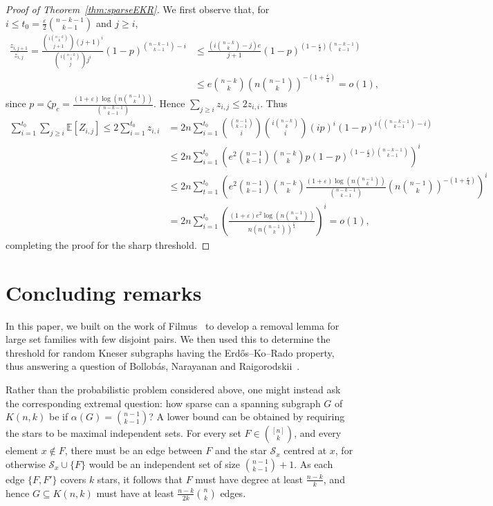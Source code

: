\documentclass[11pt]{article}
\theoremstyle{definition}
\newcommand{\eps}{\varepsilon}
\newcommand{\cS}{\mathcal{S}}
\newcommand{\3}{\bf{3}}
\newcommand{\Exp}{\mathbb{E}}
\begin{document}
\begin{proof}[Proof of Theorem~\ref{thm:sparseEKR}]
We first observe that, for $i \le t_0 = \frac{\eps}{2} \binom{n-k-1}{k-1}$ and $j \ge i$,
\begin{align*}
\frac{z_{i,j+1}}{z_{i,j}} = \frac{\binom{i \binom{n-k}{k}}{j+1} (j+1)^i}{\binom{i \binom{n-k}{k}}{j} j^i } \left( 1- p \right)^{\binom{n-k-1}{k-1} - i} &\le \frac{\left( i \binom{n-k}{k} - j \right) e}{j+1}\left( 1- p \right)^{\left(1 - \frac{\eps}{2} \right) \binom{n-k-1}{k-1}} \\
&\le e \binom{n-k}{k} \left( n \binom{n-1}{k} \right)^{- (1 + \frac{\eps}{4})} = o(1),
\end{align*}
since $p = \zeta p_c = \frac{ (1 + \eps) \log \left( n \binom{n-1}{k} \right) }{\binom{n-k-1}{k-1}}$.  Hence $\sum_{j \ge i} z_{i,j} \le 2 z_{i,i}$.  Thus
\begin{align*}
\sum_{i=1}^{t_0} \sum_{j \ge i} \Exp[Z_{i,j}] \le 2 \sum_{i=1}^{t_0} z_{i,i} &= 2n \sum_{i=1}^{t_0} \binom{\binom{n-1}{k-1}}{i} \binom{i \binom{n-k}{k}}{i} (ip)^i \left( 1 - p \right)^{i \left(\binom{n-k-1}{k-1} - i \right)} \\
	&\le 2n \sum_{i=1}^{t_0} \left( e^2 \binom{n-1}{k-1} \binom{n-k}{k} p \left(1 - p\right)^{\left( 1 - \frac{\eps}{2} \right) \binom{n-k-1}{k-1}} \right)^i \\
	&\le 2n \sum_{t=1}^{t_0} \left( e^2 \binom{n-1}{k-1} \binom{n-k}{k} \frac{ (1 + \eps) \log \left( n \binom{n-1}{k} \right) }{\binom{n-k-1}{k-1}} \left( n \binom{n-1}{k} \right)^{- (1 + \frac{\eps}{4} )} \right)^i \\
	&= 2n \sum_{i=1}^{t_0} \left( \frac{( 1 + \eps ) e^2 \log \left( n \binom{n-1}{k} \right)}{n \left( n \binom{n-1}{k} \right)^{\frac{\eps}{4} }} \right)^i = o(1),
\end{align*}
completing the proof for the sharp threshold.
\end{proof}

\section{Concluding remarks} \label{sec:conc}

In this paper, we built on the work of Filmus~\cite{fil14} to develop a removal lemma for large set families with few disjoint pairs.  We then used this to determine the threshold for random Kneser subgraphs having the Erd\H{o}s--Ko--Rado property, thus answering a question of Bollob\'as, Narayanan and Raigorodskii~\cite{bnr14}.

Rather than the probabilistic problem considered above, one might instead ask the corresponding extremal question: how sparse can a spanning subgraph $G$ of $K(n,k)$ be if $\alpha(G) = \binom{n-1}{k-1}$?  A lower bound can be obtained by requiring the stars to be maximal independent sets.  For every set $F \in \binom{[n]}{k}$, and every element $x \notin F$, there must be an edge between $F$ and the star $\cS_x$ centred at $x$, for otherwise $\cS_x \cup \{F\}$ would be an independent set of size $\binom{n-1}{k-1} + 1$.  As each edge $\{F, F'\}$ covers $k$ stars, it follows that $F$ must have degree at least $\frac{n-k}{k}$, and hence $G \subseteq K(n,k)$ must have at least $\frac{n-k}{2k} \binom{n}{k}$ edges.
\end{document}
